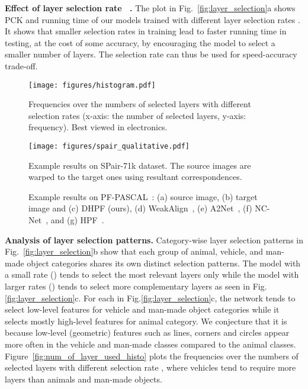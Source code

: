 \documentclass[runningheads]{llncs}
\begin{document}
\smallbreak
\noindent \textbf{Effect of layer selection rate ~\cite{veit2018convolutional}.}
The plot in Fig.~\ref{fig:layer_selection}a shows PCK and running time of our models trained with different layer selection rates . It shows that smaller selection rates in training lead to faster running time in testing, at the cost of some accuracy, by encouraging the model to select a smaller number of layers. The selection rate  can thus be used for speed-accuracy trade-off.  

\begin{figure}[!t]
  \centering
  \begin{minipage}[b]{0.58\textwidth}
    \texttt{[image: figures/histogram.pdf]}
    \caption{\label{fig:num_of_layer_used_histo}Frequencies over the numbers of selected layers with different selection rates  (x-axis: the number of selected layers, y-axis: frequency). Best viewed in electronics.}
  \end{minipage}
  \hfill
  \begin{minipage}[b]{0.4\textwidth}
    \texttt{[image: figures/spair\_qualitative.pdf]}
    \caption{\label{fig:qualitative_spair}Example results on SPair-71k dataset. The source images are warped to the target ones using resultant correspondences.}
  \end{minipage}
\end{figure}


\begin{figure}[t]
    \centering
    \caption{Example results on PF-PASCAL~\cite{ham2018proposal}: (a) source image, (b) target image and (c) DHPF (ours), (d) WeakAlign~\cite{rocco18weak}, (e) A2Net~\cite{paul2018attentive}, (f) NC-Net~\cite{rocco2018neighbourhood}, and (g) HPF~\cite{min2019hyperpixel}.}
    \label{fig:vis_pfpascal}
\end{figure}

\smallbreak
\noindent \textbf{Analysis of layer selection patterns.}
Category-wise layer selection patterns in Fig.~\ref{fig:layer_selection}b show that each group of animal, vehicle, and man-made object categories shares its own distinct selection patterns.
The model with a small rate () tends to select the most relevant layers only while the model with larger rates () tends to select more complementary layers as seen in Fig.\ref{fig:layer_selection}c.
For each  in Fig.\ref{fig:layer_selection}c, the network tends to select low-level features for vehicle and man-made object categories while it selects mostly high-level features for animal category.
We conjecture that it is because low-level (geometric) features such as lines, corners and circles appear more often in the vehicle and man-made classes compared to the animal classes.
Figure~\ref{fig:num_of_layer_used_histo} plots the frequencies over the numbers of selected layers with different selection rate , where vehicles tend to require more layers than animals and man-made objects. 
\end{document}
